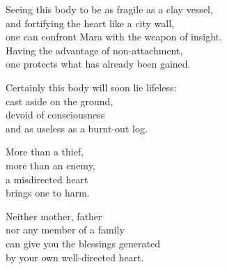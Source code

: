 Seeing this body to be as fragile as a clay vessel,\\
and fortifying the heart like a city wall,\\
one can confront Mara with the weapon of insight.\\
Having the advantage of non-attachment,\\
one protects what has already been gained.


Certainly this body will soon lie lifeless:\\
cast aside on the ground,\\
devoid of consciousness\\
and as useless as a burnt-out log.


More than a thief,\\
more than an enemy,\\
a misdirected heart\\
brings one to harm.


Neither mother, father\\
nor any member of a family\\
can give you the blessings generated\\
by your own well-directed heart.



